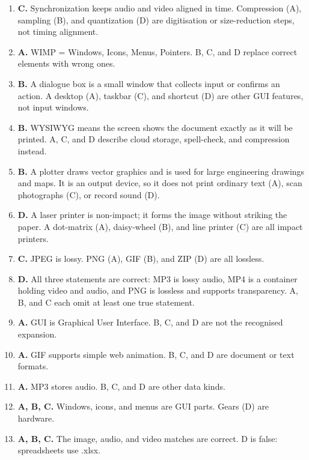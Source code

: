 \documentclass[11pt]{article}
\begin{document}
\begin{enumerate}[label=\textbf{Q\arabic*.}, leftmargin=*]
  and GIF (B) are better for graphics with exact colours, and TXT (D) is a
  plain-text format, not an image format.
\item \textbf{C.} Synchronization keeps audio and video aligned in time.
  Compression (A), sampling (B), and quantization (D) are digitisation or
  size-reduction steps, not timing alignment.
\item \textbf{A.} WIMP = Windows, Icons, Menus, Pointers. B, C, and D replace
  correct elements with wrong ones.
\item \textbf{B.} A dialogue box is a small window that collects input or
  confirms an action. A desktop (A), taskbar (C), and shortcut (D) are other
  GUI features, not input windows.
\item \textbf{B.} WYSIWYG means the screen shows the document exactly as it
  will be printed. A, C, and D describe cloud storage, spell-check, and
  compression instead.
\item \textbf{B.} A plotter draws vector graphics and is used for large
  engineering drawings and maps. It is an output device, so it does not print
  ordinary text (A), scan photographs (C), or record sound (D).
\item \textbf{D.} A laser printer is non-impact; it forms the image without
  striking the paper. A dot-matrix (A), daisy-wheel (B), and line printer (C)
  are all impact printers.
\item \textbf{C.} JPEG is lossy. PNG (A), GIF (B), and ZIP (D) are all
  lossless.
\item \textbf{D.} All three statements are correct: MP3 is lossy audio, MP4 is
  a container holding video and audio, and PNG is lossless and supports
  transparency. A, B, and C each omit at least one true statement.

\item \textbf{A.} GUI is Graphical User Interface. B, C, and D are not the recognised expansion.
\item \textbf{A.} GIF supports simple web animation. B, C, and D are document or text formats.
\item \textbf{A.} MP3 stores audio. B, C, and D are other data kinds.
\item \textbf{A, B, C.} Windows, icons, and menus are GUI parts. Gears (D) are hardware.
\item \textbf{A, B, C.} The image, audio, and video matches are correct. D is false: spreadsheets use .xlsx.
\end{enumerate}
\def\JKSSBLessonID{65}\def\JKSSBAnswers{1}
\end{document}
